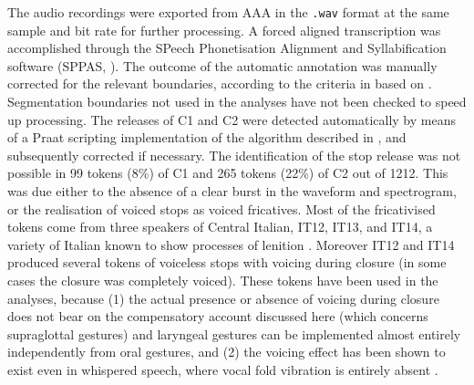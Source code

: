 \documentclass[12pt,]{article}
\begin{document}

The audio recordings were exported from AAA in the \texttt{.wav} format
at the same sample and bit rate for further processing. A forced aligned
transcription was accomplished through the SPeech Phonetisation
Alignment and Syllabification software (SPPAS, \citealt{bigi2015}). The
outcome of the automatic annotation was manually corrected for the
relevant boundaries, according to the criteria in 
based on \citet{machac2009}. Segmentation boundaries not used in the
analyses have not been checked to speed up processing. The releases of
C1 and C2 were detected automatically by means of a Praat scripting
implementation of the algorithm described in
\citet{ananthapadmanabha2014}, and subsequently corrected if necessary.
The identification of the stop release was not possible in 99 tokens
(8\%) of C1 and 265 tokens (22\%) of C2 out of 1212. This was due either
to the absence of a clear burst in the waveform and spectrogram, or the
realisation of voiced stops as voiced fricatives. Most of the
fricativised tokens come from three speakers of Central Italian, IT12,
IT13, and IT14, a variety of Italian known to show processes of lenition
\citet{hualde2011}. Moreover IT12 and IT14 produced several tokens of
voiceless stops with voicing during closure (in some cases the closure
was completely voiced). These tokens have been used in the analyses,
because (1) the actual presence or absence of voicing during closure
does not bear on the compensatory account discussed here (which concerns
supraglottal gestures) and laryngeal gestures can be implemented almost
entirely independently from oral gestures, and (2) the voicing effect
has been shown to exist even in whispered speech, where vocal fold
vibration is entirely absent \citep{sharf1964}.
\end{document}
